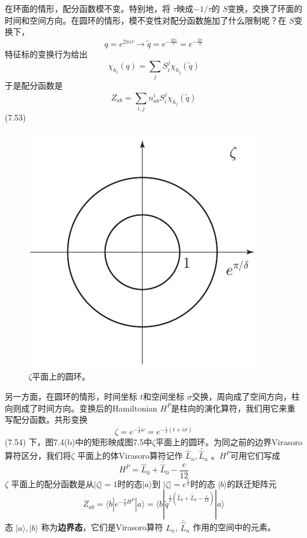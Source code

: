 在环面的情形，配分函数模不变。特别地，将 $\tau $映成$ -1/\tau $的 $S $变换，交换了环面的时间和空间方向。在圆环的情形，模不变性对配分函数施加了什么限制呢？在 $S $变换下，
$$
q=e^{2 \pi i \tau} \rightarrow \tilde{q}=e^{-\frac{2 \pi i}{\tau}}=e^{-\frac{2 \pi}{\delta}}
$$
特征标的变换行为给出
\begin{equation}
	\chi_{h_{i}}(q)=\sum_{j} S_{i}^{j} \chi_{h_{j}}(\tilde{q})
\end{equation} 
于是配分函数是
\begin{equation}
	Z_{ab}=\sum_{i, j} n_{a b}^{i} S_{i}^{j} \chi_{h_{j}}(\tilde{q})
\end{equation} \quad \quad (7.53)
\begin{figure}[h]
	\centering
	\includegraphics[width=0.6\linewidth]{fig/7.5.png}
	\caption{$\zeta$平面上的圆环。}
\end{figure}

另一方面，在圆环的情形，时间坐标 $t $和空间坐标 $\sigma $交换，周向成了空间方向，柱向则成了时间方向。变换后的Hamiltonian $H^{P} $是柱向的演化算符，我们用它来重写配分函数。共形变换
\begin{equation}
	\zeta=e^{-\frac{i}{\delta} w}=e^{-\frac{i}{\delta}(t+i \sigma)} 
\end{equation}\quad \quad (7.54)
下，图7.4(b)中的矩形映成图7.5中$ \zeta $平面上的圆环。为同之前的边界Virasoro算符区分，我们将$ \zeta$ 平面上的体Virasoro算符记作 $\hat{L}_{n}, \bar{\hat{L}}_{n}$ 。$ H^P $可用它们写成
\begin{equation}
	H^{P}=\hat{L}_{0}+\bar{\hat{L}}_{0}-\frac{c}{12}
\end{equation}
$\zeta$ 平面上的配分函数是从$ |\zeta|=1 $时的态$|a\rangle $到 $|\zeta|=e^{\frac{\pi}{\delta}} $时的态 $|b\rangle $的跃迁矩阵元
\begin{equation}
	Z_{ab}= \langle b |e^{-\frac{\pi}{\delta} H^{P}} | a \rangle= \langle b |\tilde{q}^{\frac{1}{2}\left(\hat{L}_{0}+\bar{\hat{L}}_{0}-\frac{c}{12}\right)} | a \rangle
\end{equation}
态 $|a\rangle,|b\rangle$ 称为\textbf{边界态}，它们是Virasoro算符 $\hat{L}_{n}$, $\bar{\hat{L}}_{n}$ 作用的空间中的元素。


